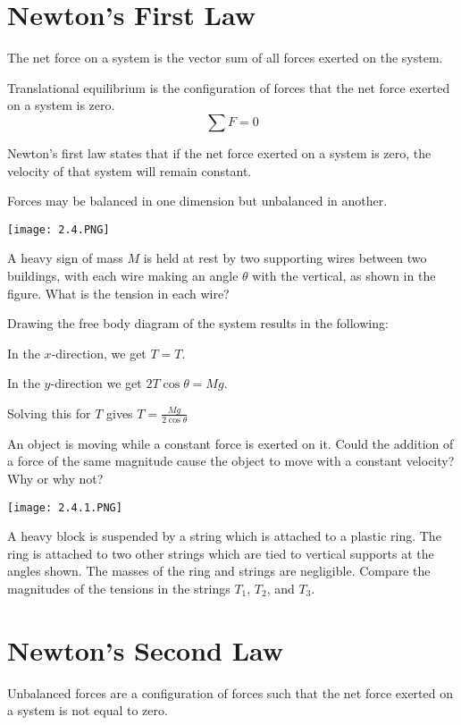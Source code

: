 \documentclass[../mech.tex]{subfiles}
\begin{document}
\section{Newton's First Law}
The net force on a system is the vector sum of all forces exerted on the system.

Translational equilibrium is the configuration of forces that the net force exerted on a system is zero.
\[ \sum F = 0 \]

Newton's first law states that if the net force exerted on a system is zero, the velocity of that system will remain constant.

Forces may be balanced in one dimension but unbalanced in another.

\begin{example}
    \begin{center}
        \texttt{[image: 2.4.PNG]}
    \end{center}
    A heavy sign of mass $M$ is held at rest by two supporting wires between two buildings, with each wire making an angle $\theta$ with the vertical, as shown in the figure. What is the tension in each wire?

    Drawing the free body diagram of the system results in the following:

    In the $x$-direction, we get $T=T$.

    In the $y$-direction we get $2T\cos\theta = Mg$.

    Solving this for $T$ gives $T=\frac{Mg}{2\cos\theta}$
\end{example}

\ex An object is moving while a constant force is exerted on it. Could the addition of a force of the same magnitude cause the object to move with a constant velocity? Why or why not?

\ex \begin{center}
    \texttt{[image: 2.4.1.PNG]}
\end{center}
A heavy block is suspended by a string which is attached to a plastic ring. The ring is attached to two other strings which are tied to vertical supports at the angles shown. The masses of the ring and strings are negligible. 
Compare the magnitudes of the tensions in the strings $T_1$, $T_2$, and $T_3$.

\section{Newton's Second Law}
Unbalanced forces are a configuration of forces such that the net force exerted on a system is not equal to zero.
\end{document}
